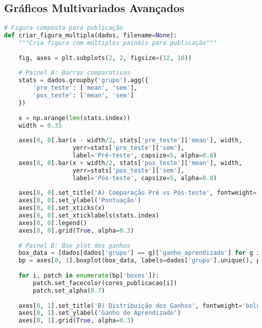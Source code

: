 \subsection{Gráficos Multivariados Avançados}

\begin{pythonbox}
\begin{lstlisting}[language=Python]
# Figura composta para publicação
def criar_figura_multipla(dados, filename=None):
    """Cria figura com múltiplos painéis para publicação"""
    
    fig, axes = plt.subplots(2, 2, figsize=(12, 10))
    
    # Painel A: Barras comparativas
    stats = dados.groupby('grupo').agg({
        'pre_teste': ['mean', 'sem'],
        'pos_teste': ['mean', 'sem']
    })
    
    x = np.arange(len(stats.index))
    width = 0.35
    
    axes[0, 0].bar(x - width/2, stats['pre_teste']['mean'], width, 
                   yerr=stats['pre_teste']['sem'], 
                   label='Pré-teste', capsize=5, alpha=0.8)
    axes[0, 0].bar(x + width/2, stats['pos_teste']['mean'], width,
                   yerr=stats['pos_teste']['sem'],
                   label='Pós-teste', capsize=5, alpha=0.8)
    
    axes[0, 0].set_title('A) Comparação Pré vs Pós-teste', fontweight='bold', loc='left')
    axes[0, 0].set_ylabel('Pontuação')
    axes[0, 0].set_xticks(x)
    axes[0, 0].set_xticklabels(stats.index)
    axes[0, 0].legend()
    axes[0, 0].grid(True, alpha=0.3)
    
    # Painel B: Box plot dos ganhos
    box_data = [dados[dados['grupo'] == g]['ganho_aprendizado'] for g in dados['grupo'].unique()]
    bp = axes[0, 1].boxplot(box_data, labels=dados['grupo'].unique(), patch_artist=True)
    
    for i, patch in enumerate(bp['boxes']):
        patch.set_facecolor(cores_publicacao[i])
        patch.set_alpha(0.7)
    
    axes[0, 1].set_title('B) Distribuição dos Ganhos', fontweight='bold', loc='left')
    axes[0, 1].set_ylabel('Ganho de Aprendizado')
    axes[0, 1].grid(True, alpha=0.3)
       \end{lstlisting}
\end{pythonbox}

